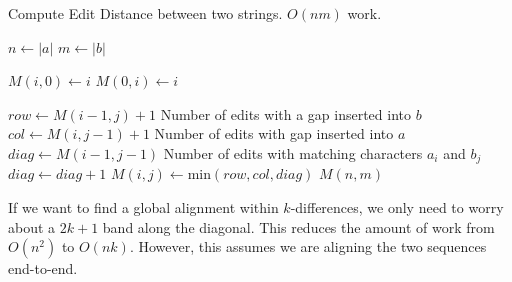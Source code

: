  \begin{algorithm}
 \caption{Compute Edit Distance between two strings.  $O(nm)$ work.}\label{edit_distance}
 \begin{algorithmic}[1]
 \State $n\gets |a|$
 \State $m\gets |b|$

    \State $M(i,0) \gets i$ \EndFor
  \State $M(0,i) \gets i$
\EndFor

  \State $row \gets M(i-1,j) + 1$ \Comment Number of edits with a gap inserted into $b$
  \State $col \gets M(i,j-1) + 1$ \Comment Number of edits with gap inserted into $a$
  \State $diag \gets M(i-1, j-1)$ \Comment Number of edits with matching characters $a_i$ and $b_j$
    $diag \gets diag +  1$ \EndIf
  \State $M(i,j) \gets \text{min}(row,col,diag)$
\EndFor
\EndFor
\Return $M(n,m)$
\EndProcedure
\end{algorithmic}
\end{algorithm}

If we want to find a global alignment within $k$-differences, we only need to worry about a $2k+1$ band along the diagonal.
This reduces the amount of work from $O(n^2)$ to $O(nk)$.
However, this assumes we are aligning the two sequences end-to-end.

